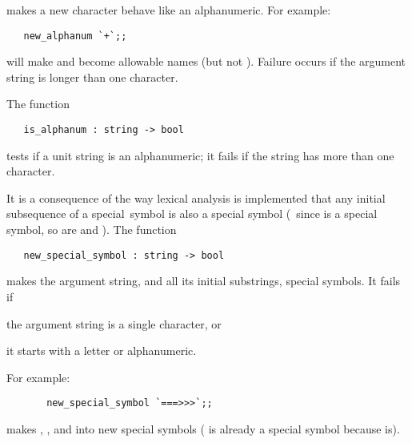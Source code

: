 \noindent makes a new character behave like an alphanumeric. For example:  

\begin{hol}\begin{verbatim}
   new_alphanum `+`;;
\end{verbatim}\end{hol}

\noindent will make  and  
become allowable names (but not ). 
Failure occurs if the argument string is longer than one character.

The function

\begin{boxed}
\begin{verbatim}
   is_alphanum : string -> bool
\end{verbatim}\end{boxed}

\noindent tests if a unit string is an alphanumeric; it fails if the string has
more than one character.

It is a consequence of the way lexical analysis is implemented that any initial
subsequence of a 
special~symbol
is also a special symbol (\eg\ since
\ml{==>} is a special symbol, so are \ml{==} and \ml{=}). The function

\begin{boxed}
\begin{verbatim}
   new_special_symbol : string -> bool
\end{verbatim}\end{boxed}
  
\noindent makes the argument string, and all its initial
 substrings, special symbols. It fails if 

\begin{myenumerate}
\item the argument string is a single character, or 
\item it starts with a letter or alphanumeric. 
\end{myenumerate}

\noindent For example:

{\small\begin{verbatim}
       new_special_symbol `===>>>`;;
\end{verbatim}}

\noindent makes \ml{===>>>}, \ml{===>>}, \ml{===>} and \ml{===} 
into new special symbols 
(\ml{==} is already a special symbol because \ml{==>} is).

